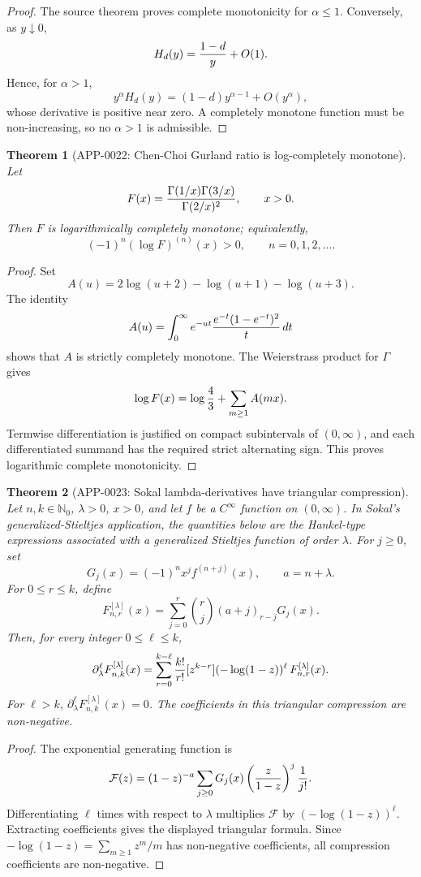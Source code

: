 \documentclass[11pt]{article}
\numberwithin{equation}{section}
\newtheorem{theorem}{Theorem}[section]
\theoremstyle{definition}
\theoremstyle{remark}
\newcommand{\1}{\mathbf 1}
\begin{document}
\begin{proof}
The source theorem proves complete monotonicity for \(\alpha\le1\).  Conversely,
as \(y\downarrow0\),
\[
  H_d(y)={1-d\over y}+O(1).
\]
Hence, for \(\alpha>1\),
\[
  y^\alpha H_d(y)=(1-d)y^{\alpha-1}+O(y^\alpha),
\]
whose derivative is positive near zero.  A completely monotone function must be
non-increasing, so no \(\alpha>1\) is admissible.
\end{proof}

\begin{theorem}[APP-0022: Chen-Choi Gurland ratio is log-completely monotone]
\label{thm:app22-gurland-logcm}
Let
\[
  F(x)={\Gamma(1/x)\Gamma(3/x)\over \Gamma(2/x)^2},\qquad x>0.
\]
Then \(F\) is logarithmically completely monotone; equivalently,
\[
  (-1)^n(\log F)^{(n)}(x)>0,\qquad n=0,1,2,\ldots .
\]
\end{theorem}

\begin{proof}
Set
\[
  A(u)=2\log(u+2)-\log(u+1)-\log(u+3).
\]
The identity
\[
 A(u)=\int_0^\infty e^{-ut}{e^{-t}(1-e^{-t})^2\over t}\,dt
\]
shows that \(A\) is strictly completely monotone.  The Weierstrass product for
\(\Gamma\) gives
\[
  \log F(x)=\log {4\over3}+\sum_{m\ge1}A(mx).
\]
Termwise differentiation is justified on compact subintervals of
\((0,\infty)\), and each differentiated summand has the required strict
alternating sign.  This proves logarithmic complete monotonicity.
\end{proof}

\begin{theorem}[APP-0023: Sokal lambda-derivatives have triangular compression]
\label{thm:app23-sokal-lambda}
Let \(n,k\in\mathbb N_0\), \(\lambda>0\), \(x>0\), and let \(f\) be a
\(C^\infty\) function on \((0,\infty)\).  In Sokal's generalized-Stieltjes
application, the quantities below are the Hankel-type expressions associated
with a generalized Stieltjes function of order \(\lambda\).  For \(j\ge0\), set
\[
  G_j(x)=(-1)^n x^j f^{(n+j)}(x),\qquad a=n+\lambda .
\]
For \(0\le r\le k\), define
\[
  F^{[\lambda]}_{n,r}(x)
   =\sum_{j=0}^r {r\choose j}(a+j)_{r-j}G_j(x).
\]
Then, for every integer \(0\le\ell\le k\),
\[
 \partial_\lambda^\ell F^{[\lambda]}_{n,k}(x)
 =\sum_{r=0}^{k-\ell}{k!\over r!}
   [z^{k-r}](-\log(1-z))^\ell\,F^{[\lambda]}_{n,r}(x).
\]
For \(\ell>k\), \(\partial_\lambda^\ell F^{[\lambda]}_{n,k}(x)=0\).  The
coefficients in this triangular compression are non-negative.
\end{theorem}

\begin{proof}
The exponential generating function is
\[
 \mathcal F(z)
 =(1-z)^{-a}\sum_{j\ge0}G_j(x)
      \left({z\over 1-z}\right)^j{1\over j!}.
\]
Differentiating \(\ell\) times with respect to \(\lambda\) multiplies
\(\mathcal F\) by \((-\log(1-z))^\ell\).  Extracting coefficients gives the
displayed triangular formula.  Since
\(-\log(1-z)=\sum_{m\ge1}z^m/m\) has non-negative coefficients, all compression
coefficients are non-negative.
\end{proof}
\end{document}
